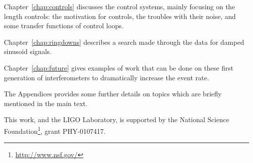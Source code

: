 Chapter~\ref{chap:controls} discusses the control systems, mainly focusing
on the length controls: the motivation for controls, the troubles with their noise,
and some transfer functions of control loops. 

Chapter~\ref{chap:ringdowns} describes a search made through the data for
damped sinusoid signals.

Chapter~\ref{chap:future} gives examples of work that can be done on these first
generation of interferometers to dramatically increase the event rate. 

The Appendices provides some further details on topics which are briefly mentioned 
in the main text.


This work, and the LIGO Laboratory, is supported by the National 
Science Foundation\footnote{\href{http://www.nsf.gov/}{http://www.nsf.gov/}}, 
grant PHY-0107417.
